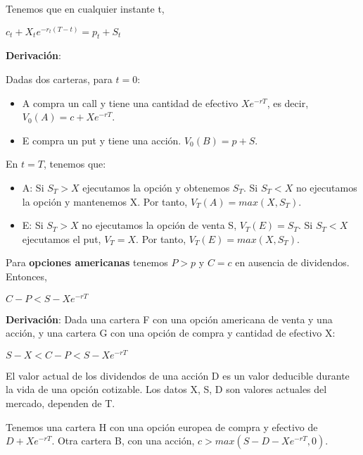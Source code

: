 \documentclass[
10pt, %
a4paper, %
oneside, %
headinclude,footinclude, %
BCOR5mm, %
]{scrartcl}
\newcommand{\n}[1]{\textbf{#1}}
\newcommand{\sub}[1]{_{#1}}
\newcommand{\pot}[1]{^{#1}}
\newcommand{\f}[1]{{\large{${#1}$}}}
\newcounter{ex}
\begin{document}
					Tenemos que en cualquier instante t, 
						\begin{center} \f{c\sub{t} + X\sub{t}e\pot{-r\sub{t}(T - t)} = p\sub{t} + S\sub{t}} \end{center}

					\n{Derivación}:

					Dadas dos carteras, para \f{t = 0}:
					\begin{itemize}
						\item A compra un call y tiene una cantidad de efectivo \f{Xe\pot{-rT}}, es decir, \f{V\sub{0}(A) = c + Xe\pot{-rT}}.
						\item E compra un put y tiene una acción. \f{V\sub{0}(B) = p + S}.
					\end{itemize}

					En \f{t = T}, tenemos que:
					\begin{itemize} 
						\item A: Si \f{S\sub{T} > X} ejecutamos la opción y obtenemos \f{S\sub{T}}. Si \f{S\sub{T} < X} no ejecutamos la opción y mantenemos X. Por tanto, \f{V\sub{T}(A) = max(X,S\sub{T})}.
						\item E: Si \f{S\sub{T} > X} no ejecutamos la opción de venta S, \f{V\sub{T}(E) = S\sub{T}}. Si \f{S\sub{T} < X} ejecutamos el put, \f{V\sub{T}=X}. Por tanto, \f{V\sub{T}(E) = max(X,S\sub{T})}.
					\end{itemize}


					Para \n{opciones americanas} tenemos \f{P > p} y \f{C = c} en ausencia de dividendos. Entonces, 
						\begin{center} \f{C - P < S - Xe\pot{-rT}} \end{center}

					\n{Derivación}:
					Dada una cartera F con una opción americana de venta y una acción, y una cartera G con una opción de compra y cantidad de efectivo X:
					\begin{center} \f{S - X < C - P < S - X e\pot{-rT}} \end{center}
				

					El valor actual de los dividendos de una acción D es un valor deducible durante la vida de una opción cotizable. Los datos X, S, D son valores actuales del mercado, dependen de T.

					Tenemos una cartera H con una opción europea de compra y efectivo de \f{D + Xe\pot{-rT}}. Otra cartera B, con una acción, \f{c > max(S-D-Xe\pot{-rT},0)}.
\end{document}
